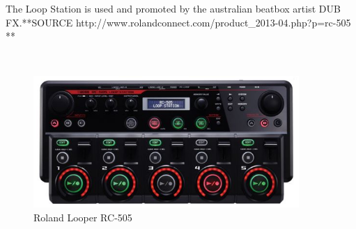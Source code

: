 The Loop Station is used and promoted by the australian beatbox artist DUB FX.**SOURCE http://www.rolandconnect.com/product_2013-04.php?p=rc-505 **

\\
\begin{figure}[h]
	\begin{center}
		\includegraphics[height=5cm]{fig/Roland-RC-505.JPG}
		\caption{Roland Looper RC-505}
		\label{Looper}
	\end{center}
\end{figure}
\\
